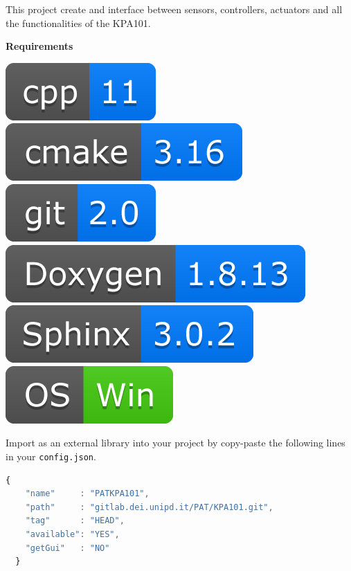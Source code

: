 
This project create and interface between sensors, controllers,
actuators and all the functionalities of the KPA101.

\textbf{Requirements}

\includegraphics[scale=0.7]{img/shilds/cpp.png}
\includegraphics[scale=0.7]{img/shilds/cmake.png}
\includegraphics[scale=0.7]{img/shilds/git.png}
\includegraphics[scale=0.7]{img/shilds/doxygen.png}
\includegraphics[scale=0.7]{img/shilds/sphinx.png}
\includegraphics[scale=0.7]{img/shilds/win.png}



Import as an external library into your project by copy-paste the
following lines in your \texttt{config.json}.

\begin{lstlisting}[language=javascript, gobble=2]
  {
    "name"     : "PATKPA101",
    "path"     : "gitlab.dei.unipd.it/PAT/KPA101.git",
    "tag"      : "HEAD",
    "available": "YES",
    "getGui"   : "NO"
  }
\end{lstlisting}

